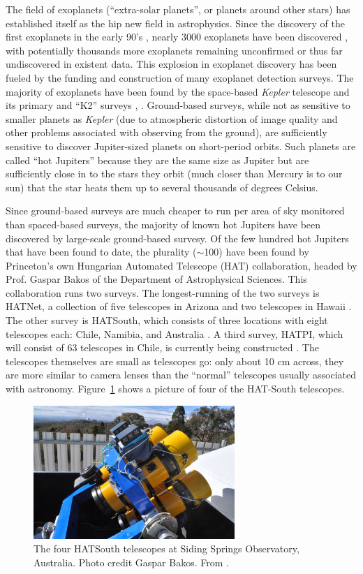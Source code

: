 
The field of exoplanets (``extra-solar planets'', or planets around other stars) has established itself as the hip new field in astrophysics. Since the discovery of the first exoplanets in the early 90's \cite{pulsarplanet}, nearly 3000 exoplanets have been discovered \cite{exoplanetorg}, with potentially thousands more exoplanets remaining unconfirmed or thus far undiscovered in existent data.  This explosion in exoplanet discovery has been fueled by the funding and construction of many exoplanet detection surveys.  The majority of exoplanets have been found by the space-based {\it Kepler} telescope and its primary and ``K2'' surveys \cite{kepler}, \cite{k2}.  Ground-based surveys, while not as sensitive to smaller planets as {\it Kepler} (due to atmospheric distortion of image quality and other problems associated with observing from the ground), are sufficiently sensitive to discover Jupiter-sized planets on short-period orbits.  Such planets are called ``hot Jupiters'' because they are the same size as Jupiter but are sufficiently close in to the stars they orbit (much closer than Mercury is to our sun) that the star heats them up to several thousands of degrees Celsius.

  Since ground-based surveys are much cheaper to run per area of sky monitored than spaced-based surveys, the majority of known hot Jupiters have been discovered by large-scale ground-based survesy.
Of the few hundred hot Jupiters that have been found to date, the plurality (${\sim}$100) have been found by Princeton's own Hungarian Automated Telescope (HAT) collaboration, headed by Prof. Gaspar Bakos of the Department of Astrophysical Sciences.  This collaboration runs two surveys. The longest-running of the two surveys is HATNet, a collection of five telescopes in Arizona and two telescopes in Hawaii \cite{hatnet}.  The other survey is HATSouth, which consists of three locations with eight telescopes each: Chile, Namibia, and Australia \cite{hatsouth}.  A third survey, HATPI, which will consist of 63 telescopes in Chile, is currently being constructed \cite{hatpi}.  The telescopes themselves are small as telescopes go: only about 10 cm across, they are more similar to camera lenses than the ``normal'' telescopes usually associated with astronomy.  Figure~\ref{hsscopes} shows a picture of four of the HAT-South telescopes.

\begin{figure}
\begin{centering}
\includegraphics[width=3in]{hs-scopes.png}
\caption{\label{hsscopes} The four HATSouth telescopes at Siding Springs Observatory, Australia.  Photo credit Gaspar Bakos.  From \cite{hatsouthpicture}.}
\end{centering}
\end{figure}

